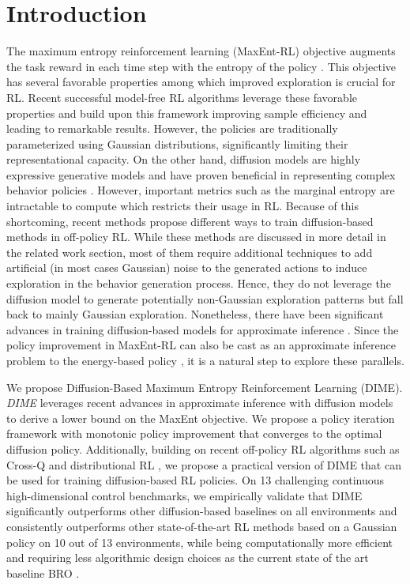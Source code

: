 \section{Introduction}

The maximum entropy reinforcement learning (MaxEnt-RL) objective augments the task reward in each time step with the entropy of the policy \cite{ziebart2008maximum,toussaint2009robot,haarnoja2017reinforcement,haarnoja2018soft}. 
This objective has several favorable properties among which improved exploration \cite{ziebart2010modeling, haarnoja2017reinforcement} is crucial for RL. 
Recent successful model-free RL algorithms leverage these favorable properties and build upon this framework \cite{bhattcrossq,nauman2024bigger} improving sample efficiency and leading to remarkable results. 
However, the policies are traditionally parameterized using Gaussian distributions, significantly limiting their representational capacity. 
On the other hand, diffusion models \cite{sohl2015deep, ho2020denoising, song2021scorebased, karras2022elucidating} are highly expressive generative models and have proven beneficial in representing complex behavior policies \cite{reuss2023goal, chi2023diffusionpolicy}. 
However, important metrics such as the marginal entropy are intractable to compute \cite{zhou2024variational} which restricts their usage in RL.
Because of this shortcoming, recent methods propose different ways to train diffusion-based methods in off-policy RL. While these methods are discussed in more detail in the related work section, most of them require additional techniques to add artificial (in most cases Gaussian) noise to the generated actions to induce exploration in the behavior generation process. Hence, they do not leverage the diffusion model to generate potentially non-Gaussian exploration patterns but fall back to mainly Gaussian exploration. 
Nonetheless, there have been significant advances in training diffusion-based models for approximate inference \cite{berneroptimal, richterimproved}. Since the policy improvement in MaxEnt-RL can also be cast as an approximate inference problem to the energy-based policy \cite{haarnoja2017reinforcement}, it is a natural step to explore these parallels.

We propose Diffusion-Based Maximum Entropy Reinforcement Learning (DIME). \textit{DIME} leverages recent advances in approximate inference with diffusion models \cite{richterimproved} to derive a lower bound on the MaxEnt objective. We propose a policy iteration framework with monotonic policy improvement that converges to the optimal diffusion policy. Additionally, building on recent off-policy RL algorithms such as Cross-Q \cite{bhattcrossq} and distributional RL \cite{bellemare2017distributional}, we propose a practical version of DIME that can be used for training diffusion-based RL policies. On 13 challenging continuous high-dimensional control benchmarks, we empirically validate that DIME significantly outperforms other diffusion-based baselines on all environments and consistently outperforms other state-of-the-art RL methods based on a Gaussian policy on 10 out of 13 environments, while being computationally more efficient and requiring less algorithmic design choices as the current state of the art baseline BRO \cite{nauman2024bigger}. 
